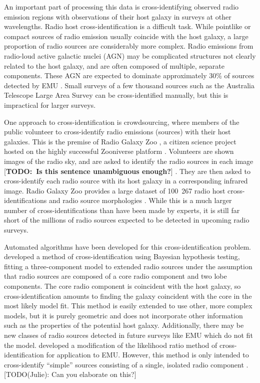 \documentclass[fleqn,usenatbib,usedcolumn]{mnras}
\newcommand{\todo}[1]{ {\color{red}[{\bf TODO:~{#1}}]} }
\begin{document}
  An important part of processing this data is cross-identifying observed radio
  emission regions with observations of their host galaxy in surveys at other
  wavelengths. Radio host cross-identification is a difficult task. While
  pointlike or compact sources of radio emission usually coincide with the host
  galaxy, a large proportion of radio sources are considerably more complex.
  Radio emissions from radio-loud active galactic nuclei (AGN) may be
  complicated structures not clearly related to the host galaxy, and are often
  composed of multiple, separate components. These AGN are expected to dominate
  approximately 30\% of sources detected by EMU \citep{norris11}. Small surveys
  of a few thousand sources such as the Australia Telescope Large Area Survey
  \citep[ATLAS;][]{norris06,middelberg08} can be cross-identified manually, but
  this is impractical for larger surveys.

  One approach to cross-identification is crowdsourcing, where members of the
  public volunteer to cross-identify radio emissions (sources) with their host
  galaxies. This is the premise of Radio Galaxy Zoo \citep[RGZ;][]{banfield15},
  a citizen science project hosted on the highly successful Zooniverse platform
  \citep{lintott08}. Volunteers are shown images of the radio sky, and are asked
  to identify the radio sources in each image \todo{Is this sentence unambiguous
  enough?}. They are then asked to cross-identify each radio source with its
  host galaxy in a corresponding infrared image. Radio Galaxy Zoo provides a
  large dataset of 100~267 radio host cross-identifications and radio source
  morphologies \citep{wong17}. While this is a much larger number of
  cross-identifications than have been made by experts, it is still far short of
  the millions of radio sources expected to be detected in upcoming radio
  surveys.

  Automated algorithms have been developed for this cross-identification
  problem. \citet{fan15} developed a method of cross-identification using
  Bayesian hypothesis testing, fitting a three-component model to extended radio
  sources under the assumption that radio sources are composed of a core radio
  component and two lobe components. The core radio component is coincident with
  the host galaxy, so cross-identification amounts to finding the galaxy
  coincident with the core in the most likely model fit. This method is easily
  extended to use other, more complex models, but it is purely geometric and
  does not incorporate other information such as the properties of the potential
  host galaxy. Additionally, there may be new classes of radio sources detected
  in future surveys like EMU which do not fit the model. \citet{weston17}
  developed a modification of the likelihood ratio method of
  cross-identification \citep{richter75} for application to EMU. However, this
  method is only intended to cross-identify ``simple'' sources consisting of a
  single, isolated radio component \citep{norris17unexpected}. [TODO(Julie): Can
  you elaborate on this?]
\end{document}
